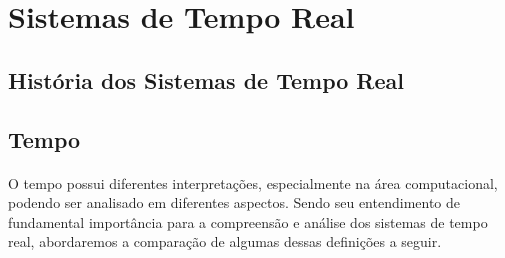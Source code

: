 \section{Sistemas de Tempo Real}
\subsection{História dos Sistemas de Tempo Real}

\subsection{Tempo}
\paragraph{}
O tempo possui diferentes interpretações, especialmente na área computacional,
podendo ser analisado em diferentes aspectos. Sendo seu entendimento de
fundamental importância para a compreensão e análise dos sistemas de tempo
real, abordaremos a comparação de algumas dessas definições a seguir.~\cite{FARINESSIS00}

